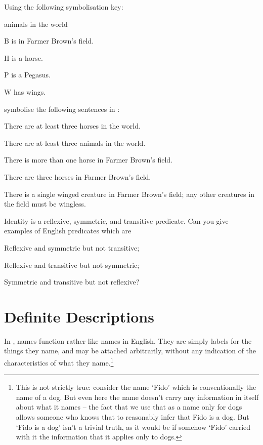 \problempart Using the following symbolisation key:
\begin{ekey}
\item[\domain] animals in the world
\item[B]  is in Farmer Brown's field.
\item[H]  is a horse.
\item[P]  is a Pegasus.
\item[W]  has wings.
\end{ekey}
symbolise the following sentences in \FOL:
\begin{earg}
\item There are at least three horses in the world.
\item There are at least three animals in the world.
\item There is more than one horse in Farmer Brown's field.
\item There are three horses in Farmer Brown's field.
\item There is a single winged creature in Farmer Brown's field; any other creatures in the field must be wingless.
\end{earg}

\problempart
Identity is a reflexive, symmetric, and transitive predicate. Can you give examples of English predicates which are \begin{earg}
	\item Reflexive and symmetric but not transitive;
	\item Reflexive and transitive but not symmetric;
	\item Symmetric and transitive but not reflexive?
\end{earg}


\chapter{Definite Descriptions}\label{subsec.defdesc}

In \FOL, names function rather like names in English. They are simply labels for the things they name, and may be attached arbitrarily, without any indication of the characteristics of what they name.\footnote{This is not strictly true: consider the name `Fido' which is conventionally the name of a dog. But even here the name doesn't carry any information in itself about what it names – the fact that we use that as a name only for dogs allows someone who knows that to reasonably infer that Fido is a dog. But `Fido is a dog' isn't a trivial truth, as it would be if somehow `Fido' carried with it the information that it applies only to dogs.} 

